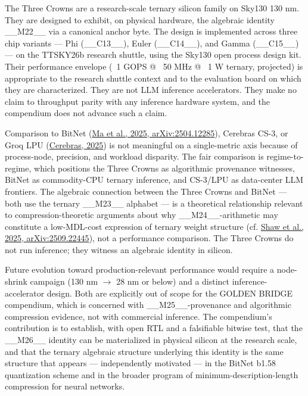 The Three Crowns are a research-scale ternary silicon family on Sky130 130 nm. They are designed to exhibit, on physical hardware, the algebraic identity \_\_M22\_\_ via a canonical anchor byte. The design is implemented across three chip variants --- Phi (\_\_C13\_\_), Euler (\_\_C14\_\_), and Gamma (\_\_C15\_\_) --- on the TTSKY26b research shuttle, using the Sky130 open process design kit. Their performance envelope (~1 GOPS @ ~50 MHz @ ~1 W ternary, projected) is appropriate to the research shuttle context and to the evaluation board on which they are characterized. They are not LLM inference accelerators. They make no claim to throughput parity with any inference hardware system, and the compendium does not advance such a claim.

Comparison to BitNet (\href{https://arxiv.org/abs/2504.12285}{Ma et al., 2025, arXiv:2504.12285}), Cerebras CS-3, or Groq LPU (\href{https://www.cerebras.ai/blog/cerebras-cs-3-vs-groq-lpu}{Cerebras, 2025}) is not meaningful on a single-metric axis because of process-node, precision, and workload disparity. The fair comparison is regime-to-regime, which positions the Three Crowns as algorithmic provenance witnesses, BitNet as commodity-CPU ternary inference, and CS-3/LPU as data-center LLM frontiers. The algebraic connection between the Three Crowns and BitNet --- both use the ternary \_\_M23\_\_ alphabet --- is a theoretical relationship relevant to compression-theoretic arguments about why \_\_M24\_\_-arithmetic may constitute a low-MDL-cost expression of ternary weight structure (cf. \href{https://arxiv.org/abs/2509.22445}{Shaw et al., 2025, arXiv:2509.22445}), not a performance comparison. The Three Crowns do not run inference; they witness an algebraic identity in silicon.

Future evolution toward production-relevant performance would require a node-shrink campaign (130 nm $\rightarrow$ 28 nm or below) and a distinct inference-accelerator design. Both are explicitly out of scope for the GOLDEN BRIDGE compendium, which is concerned with \_\_M25\_\_-provenance and algorithmic compression evidence, not with commercial inference. The compendium's contribution is to establish, with open RTL and a falsifiable bitwise test, that the \_\_M26\_\_ identity can be materialized in physical silicon at the research scale, and that the ternary algebraic structure underlying this identity is the same structure that appears --- independently motivated --- in the BitNet b1.58 quantization scheme and in the broader program of minimum-description-length compression for neural networks.

